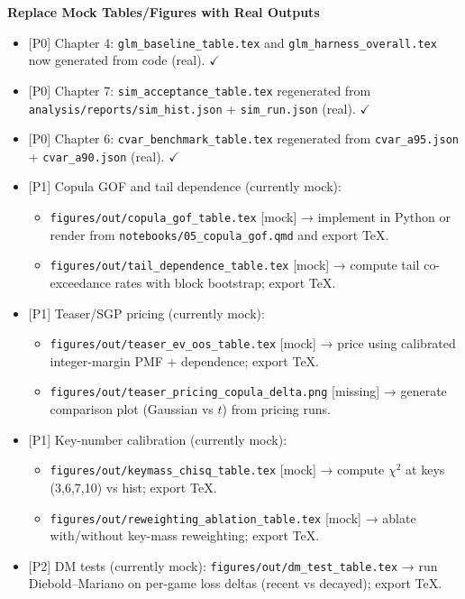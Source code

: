 \documentclass[11pt]{article}
\newcommand{\block}[1]{\par\noindent\textbf{#1}\par\vspace{0.25em}}
\newcommand{\done}{\textcolor{green!60!black}{\(\checkmark\)}}
\newcommand{\prio}[1]{\textcolor{blue!70!black}{[#1]}}
\begin{document}
\block{Replace Mock Tables/Figures with Real Outputs}
\begin{itemize}
  \item \prio{P0} Chapter 4: \texttt{glm\_baseline\_table.tex} and \texttt{glm\_harness\_overall.tex} now generated from code (real). \done
  \item \prio{P0} Chapter 7: \texttt{sim\_acceptance\_table.tex} regenerated from \texttt{analysis/reports/sim\_hist.json} + \texttt{sim\_run.json} (real). \done
  \item \prio{P0} Chapter 6: \texttt{cvar\_benchmark\_table.tex} regenerated from \texttt{cvar\_a95.json} + \texttt{cvar\_a90.json} (real). \done
  \item \prio{P1} Copula GOF and tail dependence (currently mock):
    \begin{itemize}
      \item \texttt{figures/out/copula\_gof\_table.tex} [mock] → implement in Python or render from \texttt{notebooks/05\_copula\_gof.qmd} and export TeX.
      \item \texttt{figures/out/tail\_dependence\_table.tex} [mock] → compute tail co-exceedance rates with block bootstrap; export TeX.
    \end{itemize}
  \item \prio{P1} Teaser/SGP pricing (currently mock):
    \begin{itemize}
      \item \texttt{figures/out/teaser\_ev\_oos\_table.tex} [mock] → price using calibrated integer-margin PMF + dependence; export TeX.
      \item \texttt{figures/out/teaser\_pricing\_copula\_delta.png} [missing] → generate comparison plot (Gaussian vs $t$) from pricing runs.
    \end{itemize}
  \item \prio{P1} Key-number calibration (currently mock):
    \begin{itemize}
      \item \texttt{figures/out/keymass\_chisq\_table.tex} [mock] → compute $\chi^2$ at keys (3,6,7,10) vs hist; export TeX.
      \item \texttt{figures/out/reweighting\_ablation\_table.tex} [mock] → ablate with/without key-mass reweighting; export TeX.
    \end{itemize}
  \item \prio{P2} DM tests (currently mock): \texttt{figures/out/dm\_test\_table.tex} → run Diebold–Mariano on per-game loss deltas (recent vs decayed); export TeX.

\end{itemize}
\end{document}
